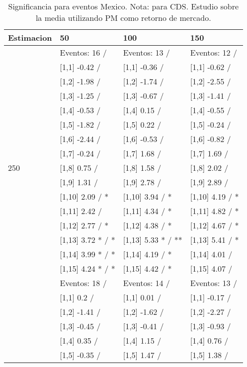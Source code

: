 \begin{table}

\caption{Significancia para eventos Mexico. Nota: para CDS. Estudio sobre la media utilizando PM como retorno de mercado.}
\centering
\begin{tabular}[t]{llll}
\toprule
Estimacion & 50 & 100 & 150\\
\midrule
 & Eventos:  16 / & Eventos:  13 / & Eventos:  12 /\\
 & {}[1,1] -0.42  / & {}[1,1] -0.36  / & {}[1,1] -0.62  /\\
 & {}[1,2] -1.98  / & {}[1,2] -1.74  / & {}[1,2] -2.55  /\\
 & {}[1,3] -1.25  / & {}[1,3] -0.67  / & {}[1,3] -1.41  /\\
 & {}[1,4] -0.53  / & {}[1,4] 0.15  / & {}[1,4] -0.55  /\\
\addlinespace
 & {}[1,5] -1.82  / & {}[1,5] 0.22  / & {}[1,5] -0.24  /\\
 & {}[1,6] -2.44  / & {}[1,6] -0.53  / & {}[1,6] -0.82  /\\
 & {}[1,7] -0.24  / & {}[1,7] 1.68  / & {}[1,7] 1.69  /\\
250 & {}[1,8] 0.75  / & {}[1,8] 1.58  / & {}[1,8] 2.02  /\\
 & {}[1,9] 1.31  / & {}[1,9] 2.78  / & {}[1,9] 2.89  /\\
\addlinespace
 & {}[1,10] 2.09  / * & {}[1,10] 3.94  / * & {}[1,10] 4.19  / *\\
 & {}[1,11] 2.42  / & {}[1,11] 4.34  / * & {}[1,11] 4.82  / *\\
 & {}[1,12] 2.77  / * & {}[1,12] 4.38  / * & {}[1,12] 4.67  / *\\
 & {}[1,13] 3.72 * / * & {}[1,13] 5.33 * / ** & {}[1,13] 5.41  / *\\
 & {}[1,14] 3.99 * / * & {}[1,14] 4.19  / * & {}[1,14] 4.01  /\\
\addlinespace
 & {}[1,15] 4.24 * / * & {}[1,15] 4.42  / * & {}[1,15] 4.07  /\\
 & Eventos:  18 / & Eventos:  14 / & Eventos:  13 /\\
 & {}[1,1] 0.2  / & {}[1,1] 0.01  / & {}[1,1] -0.17  /\\
 & {}[1,2] -1.41  / & {}[1,2] -1.62  / & {}[1,2] -2.27  /\\
 & {}[1,3] -0.45  / & {}[1,3] -0.41  / & {}[1,3] -0.93  /\\
\addlinespace
 & {}[1,4] 0.35  / & {}[1,4] 1.15  / & {}[1,4] 0.76  /\\
 & {}[1,5] -0.35  / & {}[1,5] 1.47  / & {}[1,5] 1.38  /\\

\end{tabular}
\end{table}
